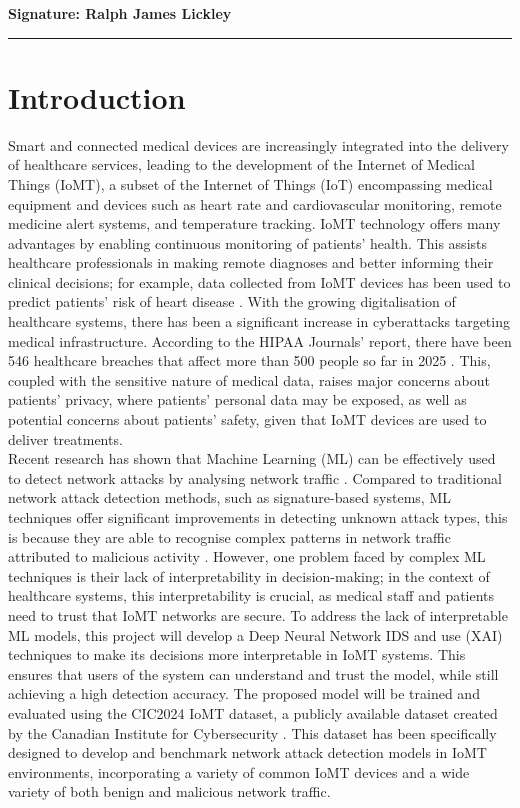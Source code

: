 \documentclass[11pt,a4paper]{article}
\begin{document}
\vspace{1em}
{\bf\noindent Signature: Ralph James Lickley } \hrule

\newpage
\clearpage
{} 
%
%
\section{Introduction}
Smart and connected medical devices are increasingly integrated into the delivery of healthcare services, leading to the development of the Internet of Medical Things (IoMT), a subset of the Internet of Things (IoT) encompassing medical equipment and devices such as heart rate and cardiovascular monitoring, remote medicine alert systems, and temperature tracking. 
IoMT technology offers many advantages by enabling continuous monitoring of patients’ health. This assists healthcare professionals in making remote diagnoses and better informing their clinical decisions; for example, data collected from IoMT devices has been used to predict patients’ risk of heart disease \cite{baseer2024healthcare}. With the growing digitalisation of healthcare systems, there has been a significant increase in cyberattacks targeting medical infrastructure. 
According to the HIPAA Journals’ report, there have been 546 healthcare breaches that affect more than 500 people so far in 2025 \cite{hipaajournal}. This, coupled with the sensitive nature of medical data, raises major concerns about patients’ privacy, where patients’ personal data may be exposed, as well as potential concerns about patients’ safety, given that IoMT devices are used to deliver treatments. 
\\
Recent research has shown that Machine Learning (ML) can be effectively used to detect network attacks by analysing network traffic \cite{althubitiids, agarapneuralids, pramilaraniforest}. 
Compared to traditional network attack detection methods, such as signature-based systems, ML techniques offer significant improvements in detecting unknown attack types, this is because they are able to recognise complex patterns in network traffic attributed to malicious activity \cite{fidelisecurity}.
However, one problem faced by complex ML techniques is their lack of interpretability in decision-making; in the context of healthcare systems, this interpretability is crucial, as medical staff and patients need to trust that IoMT networks are secure. 
To address the lack of interpretable ML models, this project will develop a Deep Neural Network IDS and use (XAI) techniques to make its decisions more interpretable in IoMT systems. This ensures that users of the system can understand and trust the model, while still achieving a high detection accuracy. The proposed model will be trained and evaluated using the CIC2024 IoMT dataset, a publicly available dataset created by the Canadian Institute for Cybersecurity \cite{dadkhah2024ciciomt2024}. This dataset has been specifically designed to develop and benchmark network attack detection models in IoMT environments, incorporating a variety of common IoMT devices and a wide variety of both benign and malicious network traffic.
\end{document}
